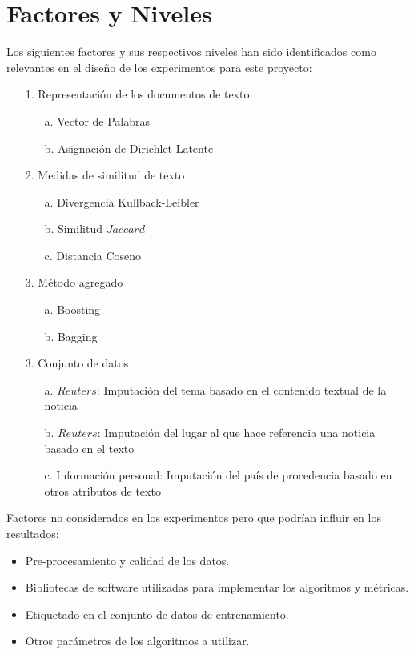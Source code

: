 \section{Factores y Niveles}
Los siguientes factores y sus respectivos niveles han sido identificados como relevantes en el diseño de los experimentos para este proyecto:
\begin{itemize}
\item [1.] Representación de los documentos de texto
\begin{itemize}
\item [a.] Vector de Palabras
\item [b.] Asignación de Dirichlet Latente
\end{itemize}

\item [2.] Medidas de similitud de texto
\begin{itemize}
\item [a.] Divergencia Kullback-Leibler
\item [b.] Similitud $Jaccard$
\item [c.] Distancia Coseno

\end{itemize}

\item [3.] Método agregado
\begin{itemize}
\item [a.] Boosting
\item [b.] Bagging
\end{itemize}

\item [3.] Conjunto de datos
\begin{itemize}
\item [a.] $Reuters$: Imputación del tema basado en el contenido textual de la noticia
\item [b.] $Reuters$: Imputación del lugar al que hace referencia una noticia basado en el texto
\item [c.] Información personal: Imputación del país de procedencia basado en otros atributos de texto
 \end{itemize}
\end{itemize}

Factores no considerados en los experimentos pero que podrían influir en los resultados:
\begin{itemize}
\item Pre-procesamiento y calidad de los datos.
\item Bibliotecas de software utilizadas para implementar los algoritmos y métricas.
\item Etiquetado en el conjunto de datos de entrenamiento.
\item Otros parámetros de los algoritmos a utilizar.
\end{itemize}


